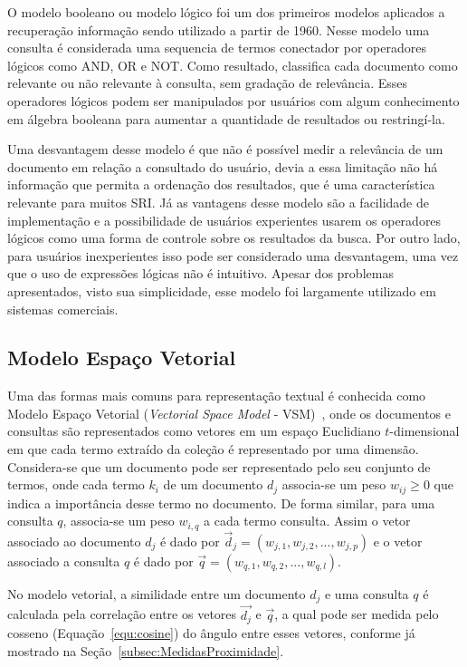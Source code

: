 O modelo booleano ou modelo lógico foi um dos primeiros modelos aplicados a recuperação informação sendo utilizado a partir de 1960. Nesse modelo uma consulta é considerada uma sequencia de termos conectador por operadores lógicos como AND, OR e NOT. Como resultado, classifica cada documento como relevante ou não relevante à consulta, sem gradação de relevância. Esses operadores lógicos podem ser manipulados por usuários com algum conhecimento em álgebra booleana para aumentar a quantidade de resultados ou restringí-la.

Uma desvantagem desse modelo é que não é possível medir a relevância de um documento em relação a consultado do usuário, devia a essa limitação não há informação que permita a ordenação dos resultados, que é uma característica relevante para muitos SRI.
Já as vantagens desse modelo são a facilidade de implementação e a possibilidade de usuários experientes usarem os operadores lógicos como uma forma de controle sobre os resultados da busca. Por outro lado, para usuários inexperientes isso pode ser considerado uma desvantagem, uma vez que o uso de expressões lógicas não é intuitivo. Apesar dos problemas apresentados, visto sua simplicidade, esse modelo foi largamente utilizado em sistemas comerciais. 



\subsection{Modelo Espaço Vetorial}
\label{subsec:modeloespacovetorial}

Uma das formas mais comuns para representação textual é conhecida como Modelo Espaço Vetorial (\textit{Vectorial Space Model} - VSM)~\cite{Rezende2003}, onde os documentos e consultas são representados como vetores em um espaço Euclidiano $t$-dimensional em que cada termo extraído da coleção é representado por uma dimensão. 
% 
Considera-se que um documento pode ser representado pelo seu conjunto de termos, onde cada termo $k_i$ de um documento $d_j$ associa-se um peso $w_{ij}\geq0$ que indica a importância desse termo no documento. 
%
De forma similar, para uma consulta $q$, associa-se um peso $w_{i,q}$ a cada termo consulta. 
%
Assim o vetor associado ao documento $d_j$ é dado por $\vec{d}_{j} = (w_{j,1}, w_{j,2}, ..., w_{j,p})$ 
%
e o vetor associado a consulta $q$ é dado por $\vec{q} = (w_{q,1}, w_{q,2}, ..., w_{q,l})$.

No modelo vetorial, a similidade entre um documento $d_j$ e uma consulta $q$ é calculada pela correlação entre os vetores $\vec{d_j}$ e $\vec{q}$, a qual pode ser medida pelo cosseno (Equação~\ref{equ:cosine}) do ângulo entre esses vetores, conforme já mostrado na Seção~\ref{subsec:MedidasProximidade}. 



